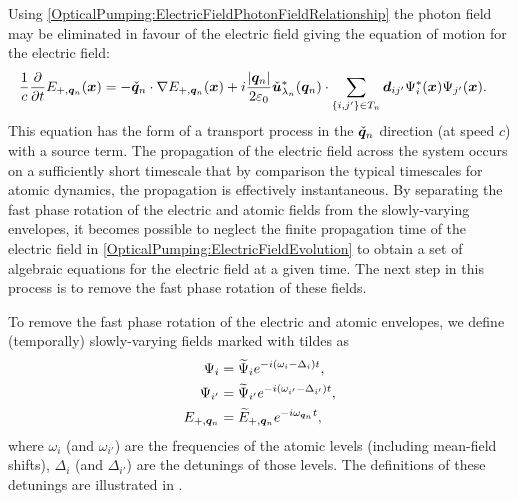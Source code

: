 Using \eqref{OpticalPumping:ElectricFieldPhotonFieldRelationship} the photon field may be eliminated in favour of the electric field giving the equation of motion for the electric field:
\begin{align}
    \frac{1}{c} \frac{\partial}{\partial t} E_{+, \vect{q}_n} (\vect{x}) &= - \unitvec{q}_n \cdot \nabla E_{+, \vect{q}_n}(\vect{x}) + i \frac{\abs{\vect{q}_n}}{2 \varepsilon_0} \unitvec{u}^*_{\lambda_n}(\vect{q}_n) \cdot \sum_{\{i,j'\}\in T_n} \vect{d}_{ij'} \Psi^*_i(\vect{x}) \Psi_{j'}(\vect{x}). \label{OpticalPumping:ElectricFieldEvolution}
\end{align}
This equation has the form of a transport process in the $\check{\bm{q}}_n$ direction (at speed $c$) with a source term.  The propagation of the electric field across the system occurs on a sufficiently short timescale that by comparison the typical timescales for atomic dynamics, the propagation is effectively instantaneous.  By separating the fast phase rotation of the electric and atomic fields from the slowly-varying envelopes, it becomes possible to neglect the finite propagation time of the electric field in \eqref{OpticalPumping:ElectricFieldEvolution} to obtain a set of algebraic equations for the electric field at a given time.  The next step in this process is to remove the fast phase rotation of these fields.

To remove the fast phase rotation of the electric and atomic envelopes, we define (temporally) slowly-varying fields marked with tildes as
\begin{subequations}
    \label{OpticalPumping:PhaseRotationDefinition}
    \begin{align}
        \Psi_i &= \widetilde{\Psi}_i e^{-i (\omega_i - \Delta_i)t}, \\
        \Psi_{i'} &= \widetilde{\Psi}_{i'} e^{-i (\omega_{i'} - \Delta_{i'}) t}, \\
        E_{+, \vect{q}_n} &= \widetilde{E}_{+, \vect{q}_n} e^{-i \omega_{\vect{q}_n}t},
    \end{align}
\end{subequations}
where $\omega_i$ (and $\omega_{i'}$) are the frequencies of the atomic levels (including mean-field shifts), $\Delta_i$ (and $\Delta_{i'}$) are the detunings of those levels.  The definitions of these detunings are illustrated in .

